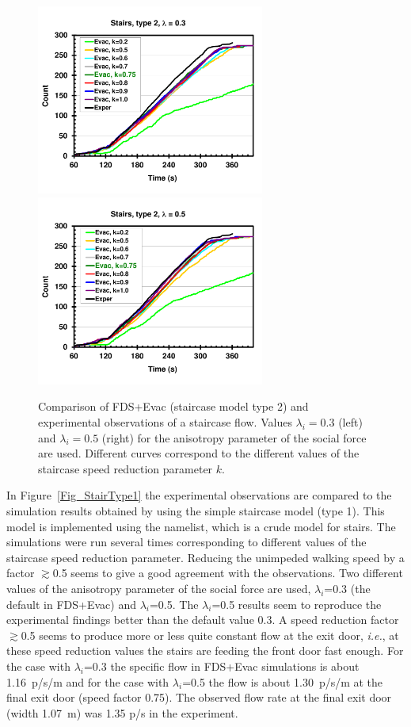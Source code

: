 \documentclass[12pt,a4paper,final,twoside]{stylevk}
\begin{document}
\begin{enumerate}
%
\begin{figure}[!tb]
  \centerline{\includegraphics[clip=true,
  width=75mm]{FIGURES/OfficeStairs_Exper_vs_Evac_Type2_L0p3}\includegraphics[clip=true,
  width=75mm]{FIGURES/OfficeStairs_Exper_vs_Evac_Type2_L0p5}}
  \caption{Comparison of FDS+Evac (staircase model type 2) and
    experimental observations of a staircase flow.  Values
    $\lambda_i=0.3$ (left) and $\lambda_i=0.5$ (right) for the
    anisotropy parameter of the social force are used.  Different
    curves correspond to the different values of the staircase speed
    reduction parameter $k$.}\label{Fig_StairType2}
\end{figure}

In Figure~\ref{Fig_StairType1} the experimental observations are
compared to the simulation results obtained by using the simple
staircase model (type 1).  This model is implemented using the
 namelist, which is a crude model for stairs.  The
simulations were run several times corresponding to different values
of the staircase speed reduction parameter.  Reducing the unimpeded
walking speed by a factor $\gtrsim$0.5 seems to give a good agreement
with the observations.  Two different values of the anisotropy
parameter of the social force are used, $\lambda_i$=0.3 (the default
in FDS+Evac) and $\lambda_i$=0.5.  The $\lambda_i$=0.5 results seem to
reproduce the experimental findings better than the default value 0.3.
A speed reduction factor $\gtrsim$0.5 seems to produce more or less
quite constant flow at the exit door, \emph{i.e.}, at these speed
reduction values the stairs are feeding the front door fast enough.
For the case with $\lambda_i$=0.3 the specific flow in FDS+Evac
simulations is about 1.16~p/s/m and for the case with $\lambda_i$=0.5
the flow is about 1.30~p/s/m at the final exit door (speed factor
0.75).  The observed flow rate at the final exit door (width 1.07~m)
was 1.35 p/s in the experiment.
%


\end{enumerate}
\end{document}
